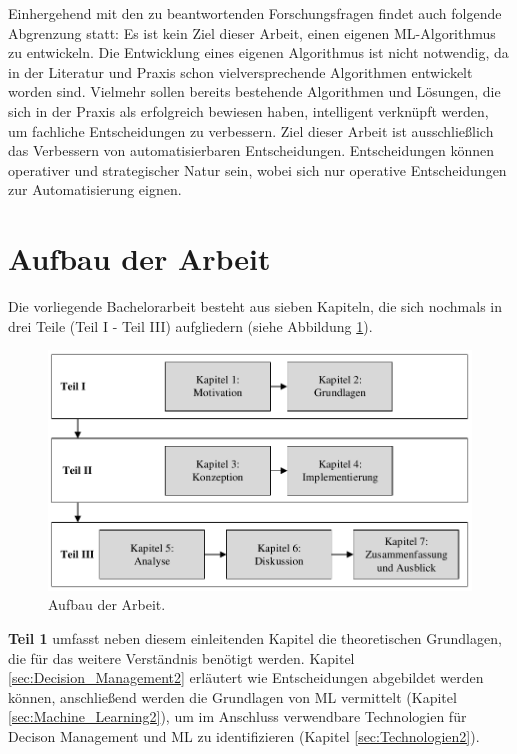 Einhergehend mit den zu beantwortenden Forschungsfragen findet auch folgende Abgrenzung statt: Es ist kein Ziel dieser Arbeit, einen eigenen ML-Algorithmus zu entwickeln. Die Entwicklung eines eigenen Algorithmus ist nicht notwendig, da in der Literatur und Praxis schon vielversprechende Algorithmen entwickelt worden sind. Vielmehr sollen bereits bestehende Algorithmen und Lösungen, die sich in der Praxis als erfolgreich bewiesen haben, intelligent verknüpft werden, um fachliche Entscheidungen zu verbessern.  Ziel dieser Arbeit ist ausschließlich das Verbessern von automatisierbaren Entscheidungen. Entscheidungen können operativer und strategischer Natur sein, wobei sich nur operative Entscheidungen zur Automatisierung eignen. 
    
\section{Aufbau der Arbeit}
\label{sec:Aufbau_der_Arbeit1}

Die vorliegende Bachelorarbeit besteht aus sieben Kapiteln, die sich nochmals in drei Teile (Teil I - Teil III) aufgliedern (siehe Abbildung \ref{fig:Aufbau}).

\begin{figure}[ht]
\centering
\includegraphics{images/Aufbau.pdf}
\caption{Aufbau der Arbeit.}
\label{fig:Aufbau}
\end{figure}

\textbf{Teil 1} umfasst neben diesem einleitenden Kapitel die theoretischen Grundlagen, die für das weitere Verständnis benötigt werden. Kapitel \ref{sec:Decision_Management2} erläutert wie Entscheidungen abgebildet werden können, anschließend werden die Grundlagen von ML vermittelt (Kapitel \ref{sec:Machine_Learning2}), um im Anschluss verwendbare Technologien für Decison Management und ML zu identifizieren (Kapitel \ref{sec:Technologien2}).  


